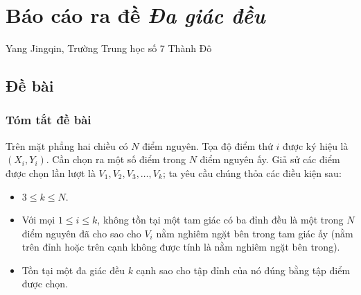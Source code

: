 \documentclass[11pt]{article}
\begin{document}
\section{Báo cáo ra đề \texorpdfstring{\emph{Đa giác đều}}{Đa giác đều}}

\begin{center}
Yang Jingqin, Trường Trung học số 7 Thành Đô
\end{center}

\renewcommand{\abstractname}{Tóm tắt}
\begin{abstract}
Bài viết này giới thiệu một bài toán \emph{Đa giác đều} do tác giả ra trong
một buổi huấn luyện nội bộ, lấy bối cảnh hình học tính toán truyền thống. Bài
toán khai thác sâu những tính chất đặc biệt của ``điểm nguyên'' thường gặp
(tức điểm lưới), rồi giấu ràng buộc đặc biệt của đề trong một điều kiện quen
thuộc đến mức mọi người dễ xem nhẹ. Bài này đồng thời kết hợp quy hoạch động,
thuật toán hash, quy nạp và chứng minh toán học; đây là một bài hay, phủ rộng
nhiều thuật toán và có độ khó tư duy tương đối cao.

Ngoài ra, cách chia điểm thành phần của bài khá nhiều và hợp lý, dữ liệu mạnh,
độ phân hóa cao. Dù thí sinh chỉ viết vét cạn, hay đã suy nghĩ thêm một chút,
hay nghiên cứu sâu và tìm được mọi tính chất, đều có thể nhận được phần điểm
phù hợp.

Bài này cũng đưa ra một hướng ra đề: khai thác sâu tính chất của những điều
kiện thường gặp, rồi giấu điều kiện quan trọng trong các tính chất ấy, khiến
bài có độ khó tư duy cao hơn và đòi hỏi thí sinh có sức quan sát sắc bén hơn
để giải. Hy vọng bài viết có ích và gợi cho mọi người suy nghĩ thêm về những
ràng buộc quen thuộc.
\end{abstract}

\subsection{Đề bài}

\subsubsection{Tóm tắt đề bài}

Trên mặt phẳng hai chiều có \(N\) điểm nguyên. Tọa độ điểm thứ \(i\) được ký
hiệu là \((X_i,Y_i)\). Cần chọn ra một số điểm trong \(N\) điểm nguyên ấy. Giả
sử các điểm được chọn lần lượt là \(V_1,V_2,V_3,\ldots,V_k\); ta yêu cầu chúng
thỏa các điều kiện sau:

\begin{itemize}
  \item \(3\le k\le N\).

  \item Với mọi \(1\le i\le k\), không tồn tại một tam giác có ba đỉnh đều là
  một trong \(N\) điểm nguyên đã cho sao cho \(V_i\) nằm nghiêm ngặt bên trong
  tam giác ấy (nằm trên đỉnh hoặc trên cạnh không được tính là nằm nghiêm ngặt
  bên trong).

  \item Tồn tại một đa giác đều \(k\) cạnh sao cho tập đỉnh của nó đúng bằng
  tập điểm được chọn.
\end{itemize}
\end{document}
